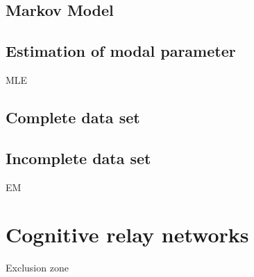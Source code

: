 \subsection{Markov Model}
\subsection{Estimation of modal parameter}
\ac{MLE}
\subsection{Complete data set}
\subsection{Incomplete data set}
\ac{EM}\cite{Kaushik_WCNC} 
\section{Cognitive relay networks}
Exclusion zone
%
%
%
